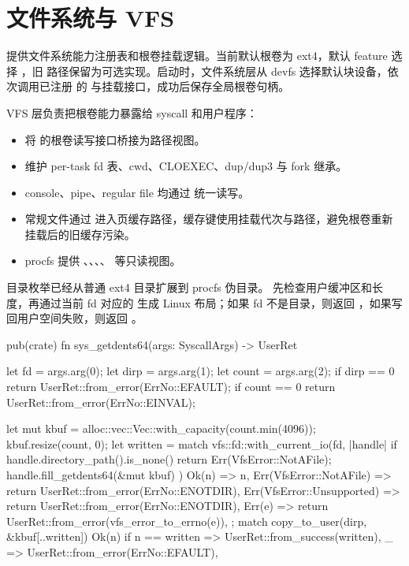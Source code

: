 \section{文件系统与 VFS}

 提供文件系统能力注册表和根卷挂载逻辑。当前默认根卷为 ext4，默认 feature 选择 ，旧  路径保留为可选实现。启动时，文件系统层从 devfs 选择默认块设备，依次调用已注册  的  与挂载接口，成功后保存全局根卷句柄。

VFS 层负责把根卷能力暴露给 syscall 和用户程序：

\begin{itemize}
 \item {} 将  的根卷读写接口桥接为路径视图。
 \item {} 维护 per-task fd 表、cwd、CLOEXEC、dup/dup3 与 fork 继承。
 \item console、pipe、regular file 均通过  统一读写。
 \item 常规文件通过  进入页缓存路径，缓存键使用挂载代次与路径，避免根卷重新挂载后的旧缓存污染。
 \item procfs 提供 、、、、 等只读视图。
\end{itemize}

目录枚举已经从普通 ext4 目录扩展到 procfs 伪目录。 先检查用户缓冲区和长度，再通过当前 fd 对应的  生成 Linux  布局；如果 fd 不是目录，则返回 ，如果写回用户空间失败，则返回 。

\begin{rustcode}
pub(crate) fn sys_getdents64(args: SyscallArgs) -> UserRet {
    let fd = args.arg(0);
    let dirp = args.arg(1);
    let count = args.arg(2);
    if dirp == 0 { return UserRet::from_error(ErrNo::EFAULT); }
    if count == 0 { return UserRet::from_error(ErrNo::EINVAL); }

    let mut kbuf = alloc::vec::Vec::with_capacity(count.min(4096));
    kbuf.resize(count, 0);
    let written = match vfs::fd::with_current_io(fd, |handle| {
        if handle.directory_path().is_none() {
            return Err(VfsError::NotAFile);
        }
        handle.fill_getdents64(&mut kbuf)
    }) {
        Ok(n) => n,
        Err(VfsError::NotAFile) => return UserRet::from_error(ErrNo::ENOTDIR),
        Err(VfsError::Unsupported) => return UserRet::from_error(ErrNo::ENOTDIR),
        Err(e) => return UserRet::from_error(vfs_error_to_errno(e)),
    };
    match copy_to_user(dirp, &kbuf[..written]) {
        Ok(n) if n == written => UserRet::from_success(written),
        _ => UserRet::from_error(ErrNo::EFAULT),
    }
}
\end{rustcode}

